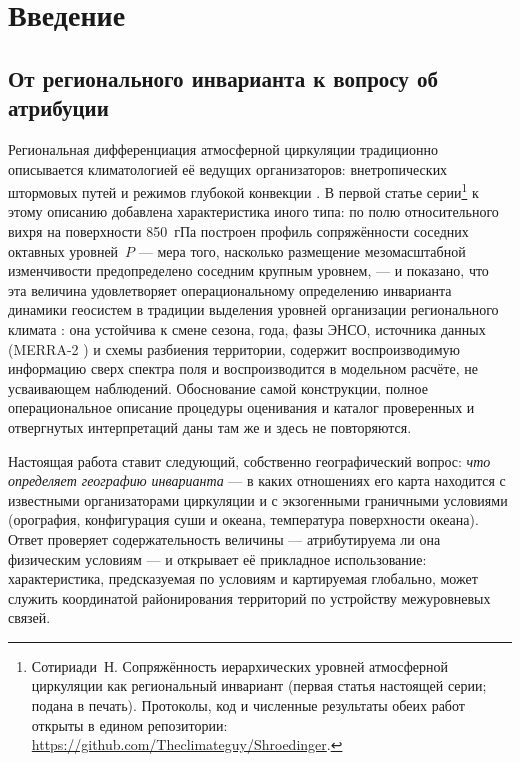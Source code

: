 \documentclass[11pt,a4paper]{article}
\begin{document}
\section{Введение}
\label{sec:intro}

\subsection{От регионального инварианта к вопросу об атрибуции}

Региональная дифференциация атмосферной циркуляции традиционно описывается климатологией её ведущих организаторов: внетропических штормовых путей \cite{HoskinsValdes1990,Chang2002,Shaw2016} и режимов глубокой конвекции \cite{Houze2004}. В первой статье серии\footnote{Сотириади~Н. Сопряжённость иерархических уровней атмосферной циркуляции как региональный инвариант (первая статья настоящей серии; подана в печать). Протоколы, код и численные результаты обеих работ открыты в едином репозитории: \url{https://github.com/Theclimateguy/Shroedinger}.} к этому описанию добавлена характеристика иного типа: по полю относительного вихря на поверхности 850~гПа построен профиль сопряжённости соседних октавных уровней~$P$ --- мера того, насколько размещение мезомасштабной изменчивости предопределено соседним крупным уровнем, --- и показано, что эта величина удовлетворяет операциональному определению инварианта динамики геосистем \cite{Puzachenko1986,Puzachenko2004,Puzachenko2010} в традиции выделения уровней организации регионального климата \cite{Krenke2019}: она устойчива к смене сезона, года, фазы ЭНСО, источника данных (MERRA-2 \cite{Gelaro2017}) и схемы разбиения территории, содержит воспроизводимую информацию сверх спектра поля и воспроизводится в модельном расчёте, не усваивающем наблюдений. Обоснование самой конструкции, полное операциональное описание процедуры оценивания и каталог проверенных и отвергнутых интерпретаций даны там же и здесь не повторяются.

Настоящая работа ставит следующий, собственно географический вопрос: \emph{что определяет географию инварианта} --- в каких отношениях его карта находится с известными организаторами циркуляции и с экзогенными граничными условиями (орография, конфигурация суши и океана, температура поверхности океана). Ответ проверяет содержательность величины --- атрибутируема ли она физическим условиям --- и открывает её прикладное использование: характеристика, предсказуемая по условиям и картируемая глобально, может служить координатой районирования территорий по устройству межуровневых связей.
\end{document}
